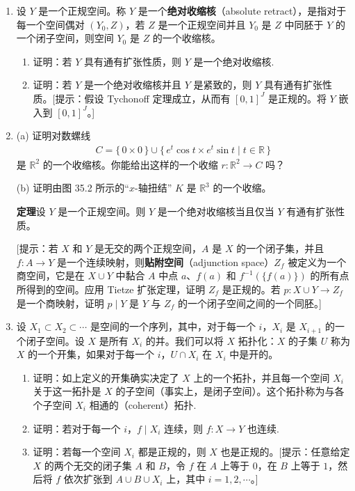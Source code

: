 \begin{enumerate}
\begin{enumerate}
\end{enumerate}
\item 设 $Y$ 是一个正规空间。称 $Y$ 是一个\textbf{绝对收缩核}（absolute retract），是指对于每一个空间偶对 $(Y_{0},Z)$，若 $Z$ 是一个正规空间并且 $Y_{0}$ 是 $Z$ 中同胚于 $Y$ 的一个闭子空间，则空间 $Y_{0}$ 是 $Z$ 的一个收缩核。
\begin{enumerate}
\item 证明：若 $Y$ 具有通有扩张性质，则 $Y$ 是一个绝对收缩核.
\item 证明：若 $Y$ 是一个绝对收缩核并且 $Y$ 是紧致的，则 $Y$ 具有通有扩张性质。[提示：假设 Tychonoff 定理成立，从而有 $[0,1]^{J}$ 是正规的。将 $Y$ 嵌入到 $[0,1]^{J}$。]
\end{enumerate}
\item (a) 证明对数螺线
\begin{align*}
C=\{\,0\times 0\,\}\cup\{\,e^{t}\cos t\times e^{t}\sin t\mid t\in\mathbb{R}\,\}
\end{align*}
是 $\mathbb{R}^{2}$ 的一个收缩核。你能给出这样的一个收缩 $r\colon\mathbb{R}^{2}\to C$ 吗？

(b) 证明由图 35.2 所示的``$x$-轴扭结'' $K$ 是 $\mathbb{R}^{3}$ 的一个收缩。

\textbf{定理}\quad 设 $Y$ 是一个正规空间。则 $Y$ 是一个绝对收缩核当且仅当 $Y$ 有通有扩张性质。

[提示：若 $X$ 和 $Y$ 是无交的两个正规空间，$A$ 是 $X$ 的一个闭子集，并且 $f\colon A\to Y$ 是一个连续映射，则\textbf{贴附空间}（adjunction space）$Z_{f}$ 被定义为一个商空间，它是在 $X\cup Y$ 中黏合 $A$ 中点 $a$、$f(a)$ 和 $f^{-1}(\{f(a)\})$ 的所有点所得到的空间。应用 Tietze 扩张定理，证明 $Z_{f}$ 是正规的。若 $p\colon X\cup Y\to Z_{f}$ 是一个商映射，证明 $p\mid Y$ 是 $Y$ 与 $Z_{f}$ 的一个闭子空间之间的一个同胚。]
\item 设 $X_{1}\subset X_{2}\subset\cdots$ 是空间的一个序列，其中，对于每一个 $i$，$X_{i}$ 是 $X_{i+1}$ 的一个闭子空间。设 $X$ 是所有 $X_{i}$ 的并。我们可以将 $X$ 拓扑化：$X$ 的子集 $U$ 称为 $X$ 的一个开集，如果对于每一个 $i$，$U\cap X_{i}$ 在 $X_{i}$ 中是开的。
\begin{enumerate}
\item 证明：如上定义的开集确实决定了 $X$ 上的一个拓扑，并且每一个空间 $X_{i}$ 关于这一拓扑是 $X$ 的子空间（事实上，是闭子空间）。这个拓扑称为与各个子空间 $X_{i}$ 相通的（coherent）拓扑.
\item 证明：若对于每一个 $i$，$f\mid X_{i}$ 连续，则 $f\colon X\to Y$ 也连续.
\item 证明：若每一个空间 $X_{i}$ 都是正规的，则 $X$ 也是正规的。[提示：任意给定 $X$ 的两个无交的闭子集 $A$ 和 $B$，令 $f$ 在 $A$ 上等于 $0$，在 $B$ 上等于 $1$，然后将 $f$ 依次扩张到 $A\cup B\cup X_{i}$ 上，其中 $i=1,2,\cdots$。]
\end{enumerate}
\end{enumerate}